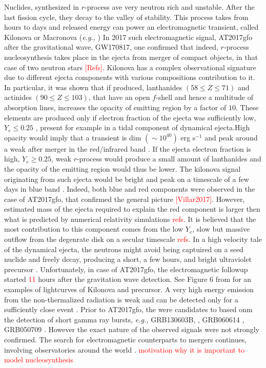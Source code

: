 \documentclass[11pt,a4paper,headinclude=true,DIV=14,BCOR=8mm,chapterprefix,listof=totoc,twoside,openright,abstracton]{scrbook}
\newcommand{\red}[1]{\textcolor{red}{#1}}
\begin{document}
Nuclides, synthesized in $r$-process ave very neutron rich and unstable. After the last fission cycle, they decay to the valley of stability. This process takes from hours to days and released energy can power an electromagnetic transient, called Kilonova or Macronova (\textit{e.g.,} \cite{Li:1998bw,Kulkarni:2005jw,Metzger:2010,Roberts:2011,Metzger:2016pju,Wollaeger:2017ahm})
%
In 2017 such electromagnetic signal, AT2017gfo after the gravitational wave, GW170817, one 
confirmed that indeed, $r$-process nucleosynthesis takes place in the ejecta from merger of compact objects, in that case of two neutron stars \red{[Refs]}. 
Kilonova has a complex observational signature due to different ejecta components with various compositions contribution to it. In particular, it was shown that if produced, lanthanides $(58\leq Z \leq71)$ and actinides $(90\leq Z \leq 103)$, that have an open $f$-shell and hence a multitude of absorption lines, increases the opacity of emitting region by a factor of $10$. These elements are produced only if electron fraction of the ejecta was sufficiently low, $Y_e\leq 0.25$ \cite{Lippuner:2015gwa}, present for example in a tidal component of dynamical ejecta.High opacity would imply that a transient is dim $(\sim10^{40})$ erg s$^{-1}$ and peak around a weak after merger in the red/infrared band \cite{Barnes:2013wka,Grossman:2013lqa,Lippuner:2015gwa}. 
If the ejecta electron fraction is high, $Y_e \geq 0.25$, weak $r$-process would produce a small amount of lanthanides and the opacity of the emitting region would thus be lower. The kilonova signal originating from such ejecta would be bright and peak on a timescale of a few days in blue band \cite{Kasen:2014toa,Martin:2015hxa}. 
%
Indeed, both blue and red components were observed in the case of AT2017gfo, that confirmed the general picture \red{[Villar2017]}. However, estimated mass of the ejecta required to explain the red component is larger then what is predicted by numerical relativity simulations \red{refs}. It is believed that the most contribution to this component comes from the low $Y_e$, slow but massive outflow from the degenrate disk on a secular timescale \red{refs}.
%
In a high velocity tale of the dynamical ejecta, the neutrons might avoid being captuired on a seed nuclide and freely decay, producing a short, a few hours, and bright ultraviolet precursor \cite{Metzger:2014yda}. Unfortunately, in case of AT2017gfo, the electromagnetic followup started \red{11} hours after the gravitation wave detection.
%
See Figure 6 from \cite{Metzger:2016pju} for an examples of lightcurves of Kilonova and precursor.
%
A very high energy emission from the non-thermalized radiation is weak and can be detected only for a sufficiently close event \cite{Hotokezaka:2015cma}.
% 
Prior to AT2017gfo, the were candidates to based onm the detection of short gamma ray bursts, \textit{e.g.,} GRB130603B, \cite{Berger:2013wna,Tanvir:2013pia}, GRB060614 \cite{Jin:2015txa,Yang:2015pha}, GRB050709 \cite{Jin:2016pnm}. However the exact nature of the observed signals were not strongly confirmed. 
%
The search for electromagnetic counterparts to mergers continues, involving observatories around the world \cite{Law:2009,Singer:2014qca,Bellm:2014,Kasliwal:2016uhu}.
%
\red{motivation why it is important to model nucleosynthesis}
\end{document}
